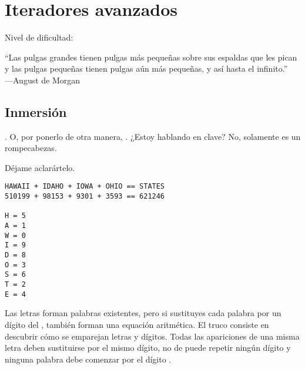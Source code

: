 
\chapter{Iteradores avanzados}\label{ch:iteravan}

\noindent
Nivel de dificultad:\difllll

\begin{citaCap}
``Las pulgas grandes tienen pulgas más pequeñas sobre sus espaldas que les pican \\
y las pulgas pequeñas tienen pulgas aún más pequeñas, y así hasta el infinito.''\\
---August de Morgan
\end{citaCap}

\section{Inmersión}

. O, por ponerlo de otra manera, . ¿Estoy hablando en clave? No, solamente es un rompecabezas.

Déjame aclarártelo.

\noindent\begin{minipage}{\textwidth}
\begin{lstlisting}[mathescape=True]
HAWAII + IDAHO + IOWA + OHIO == STATES
510199 + 98153 + 9301 + 3593 == 621246

H = 5
A = 1
W = 0
I = 9
D = 8
O = 3
S = 6
T = 2
E = 4
\end{lstlisting}
\end{minipage}

Las letras forman palabras existentes, pero si sustituyes cada palabra por un dígito del , también forman una equación aritmética. El truco consiste en descubrir cómo se emparejan letras y dígitos. Todas las apariciones de una misma letra deben sustituirse por el mismo dígito, no de puede repetir ningún dígito y ninguna palabra debe comenzar por el dígito .


